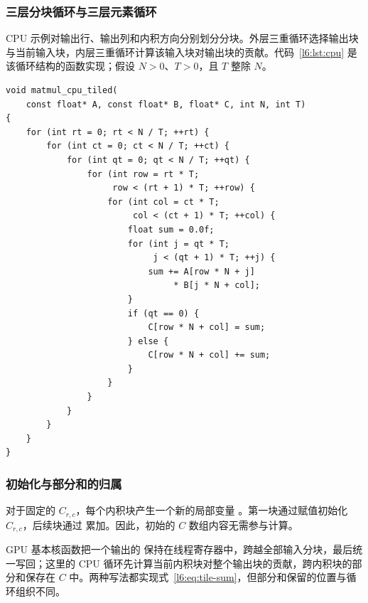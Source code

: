 \subsubsection{三层分块循环与三层元素循环}
\par\noindent\begin{minipage}{\linewidth}
CPU 示例对输出行、输出列和内积方向分别划分分块。外层三重循环选择输出块与当前输入块，内层三重循环计算该输入块对输出块的贡献。代码~\ref{l6:lst:cpu} 是该循环结构的函数实现；假设 $N>0$、$T>0$，且 $T$ 整除 $N$。

\begin{lstlisting}[caption={CPU 缓存分块矩阵乘法，保持每个内积块的部分和累加顺序。},label={l6:lst:cpu}]
void matmul_cpu_tiled(
    const float* A, const float* B, float* C, int N, int T)
{
    for (int rt = 0; rt < N / T; ++rt) {
        for (int ct = 0; ct < N / T; ++ct) {
            for (int qt = 0; qt < N / T; ++qt) {
                for (int row = rt * T;
                     row < (rt + 1) * T; ++row) {
                    for (int col = ct * T;
                         col < (ct + 1) * T; ++col) {
                        float sum = 0.0f;
                        for (int j = qt * T;
                             j < (qt + 1) * T; ++j) {
                            sum += A[row * N + j]
                                 * B[j * N + col];
                        }
                        if (qt == 0) {
                            C[row * N + col] = sum;
                        } else {
                            C[row * N + col] += sum;
                        }
                    }
                }
            }
        }
    }
}
\end{lstlisting}
\end{minipage}\par

\subsubsection{初始化与部分和的归属}
对于固定的 $C_{r,c}$，每个内积块产生一个新的局部变量 。第一块通过赋值初始化 $C_{r,c}$，后续块通过 \code{+=} 累加。因此，初始的 $C$ 数组内容无需参与计算。

GPU 基本核函数把一个输出的  保持在线程寄存器中，跨越全部输入分块，最后统一写回；这里的 CPU 循环先计算当前内积块对整个输出块的贡献，跨内积块的部分和保存在 $C$ 中。两种写法都实现式~\eqref{l6:eq:tile-sum}，但部分和保留的位置与循环组织不同。
\FloatBarrier
